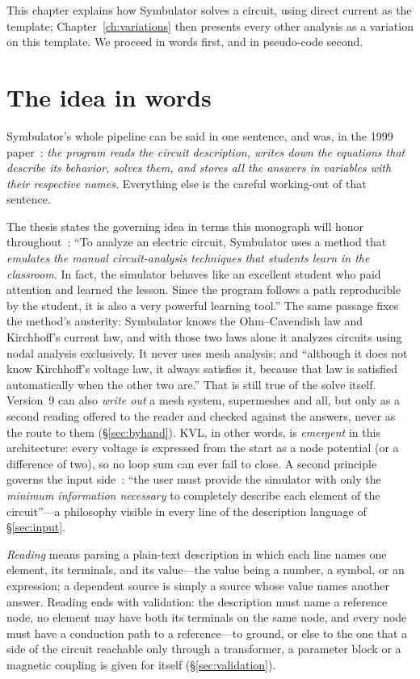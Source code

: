 \documentclass[11pt,oneside]{report}
\begin{document}
This chapter explains how Symbulator solves a circuit, using direct
current as the template; Chapter~\ref{ch:variations} then presents
every other analysis as a variation on this template. We proceed in
words first, and in pseudo-code second.

\section{The idea in words}
\label{sec:idea}

Symbulator's whole pipeline can be said in one sentence, and was, in
the 1999 paper~\cite{paper1999}: \emph{the program reads the circuit
description, writes down the equations that describe its behavior,
solves them, and stores all the answers in variables with their
respective names.} Everything else is the careful working-out of that
sentence.

The thesis states the governing idea in terms this monograph will
honor throughout~\cite[\S1.4]{thesis2000}: ``To analyze an electric
circuit, Symbulator uses a method that \emph{emulates the manual
circuit-analysis techniques that students learn in the
classroom}. In fact, the simulator behaves like an excellent student
who paid attention and learned the lesson. Since the program follows
a path reproducible by the student, it is also a very powerful
learning tool.'' The same passage fixes the method's austerity:
Symbulator knows the Ohm--Cavendish law and Kirchhoff's current law,
and with those two laws alone it analyzes circuits using nodal
analysis exclusively. It never uses mesh analysis; and ``although it
does not know Kirchhoff's voltage law, it always satisfies it,
because that law is satisfied automatically when the other two
are.'' That is still true of the solve itself. Version~9 can also
\emph{write out} a mesh system, supermeshes and all, but only as a
second reading offered to the reader and checked against the answers,
never as the route to them (\S\ref{sec:byhand}). KVL, in other words,
is \emph{emergent} in this architecture:
every voltage is expressed from the start as a node potential (or a
difference of two), so no loop sum can ever fail to close. A second
principle governs the input side~\cite[\S1.8.1]{thesis2000}: ``the
user must provide the simulator with only the \emph{minimum
information necessary} to completely describe each element of the
circuit''---a philosophy visible in every line of the description
language of \S\ref{sec:input}.

\emph{Reading} means parsing a plain-text description in which each
line names one element, its terminals, and its value---the value being
a number, a symbol, or an expression; a dependent source is simply a
source whose value names another answer. Reading ends with validation:
the description must name a reference node, no element may have both
its terminals on the same node, and every node must have a conduction
path to a reference---to ground, or else to the one that a side of the
circuit reachable only through a transformer, a parameter block or a
magnetic coupling is given for itself (\S\ref{sec:validation}).
\end{document}
